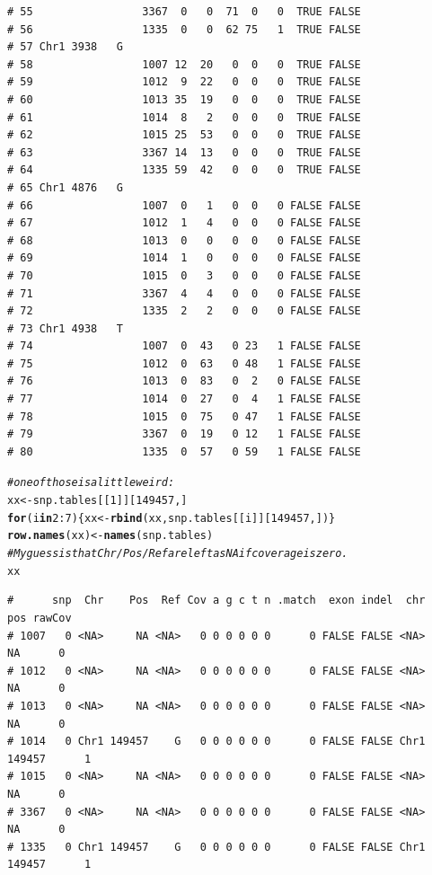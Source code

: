 \documentclass{article}\usepackage[]{graphicx}\usepackage[]{color}
\makeatletter
\newcommand{\hlnum}[1]{\textcolor[rgb]{0.686,0.059,0.569}{#1}}%
\newcommand{\hlcom}[1]{\textcolor[rgb]{0.678,0.584,0.686}{\textit{#1}}}%
\newcommand{\hlopt}[1]{\textcolor[rgb]{0,0,0}{#1}}%
\newcommand{\hlstd}[1]{\textcolor[rgb]{0.345,0.345,0.345}{#1}}%
\newcommand{\hlkwa}[1]{\textcolor[rgb]{0.161,0.373,0.58}{\textbf{#1}}}%
\newcommand{\hlkwb}[1]{\textcolor[rgb]{0.69,0.353,0.396}{#1}}%
\newcommand{\hlkwd}[1]{\textcolor[rgb]{0.737,0.353,0.396}{\textbf{#1}}}%
\newenvironment{kframe}{%
 \def\at@end@of@kframe{}%
 \ifinner\ifhmode%
  \def\at@end@of@kframe{\end{minipage}}%
  \begin{minipage}{\columnwidth}%
 \fi\fi%
 \def\FrameCommand##1{\hskip\@totalleftmargin \hskip-\fboxsep
 \colorbox{shadecolor}{##1}\hskip-\fboxsep
     \hskip-\linewidth \hskip-\@totalleftmargin \hskip\columnwidth}%
 \MakeFramed {\advance\hsize-\width
   \@totalleftmargin\z@ \linewidth\hsize
   \@setminipage}}%
 {\par\unskip\endMakeFramed%
 \at@end@of@kframe}
\newenvironment{knitrout}{}{} %
\makeatother
\begin{document}
\begin{knitrout}
\begin{kframe}
\begin{verbatim}
# 55                 3367  0   0  71  0   0  TRUE FALSE        
# 56                 1335  0   0  62 75   1  TRUE FALSE        
# 57 Chr1 3938   G                                             
# 58                 1007 12  20   0  0   0  TRUE FALSE        
# 59                 1012  9  22   0  0   0  TRUE FALSE        
# 60                 1013 35  19   0  0   0  TRUE FALSE        
# 61                 1014  8   2   0  0   0  TRUE FALSE        
# 62                 1015 25  53   0  0   0  TRUE FALSE        
# 63                 3367 14  13   0  0   0  TRUE FALSE        
# 64                 1335 59  42   0  0   0  TRUE FALSE        
# 65 Chr1 4876   G                                             
# 66                 1007  0   1   0  0   0 FALSE FALSE        
# 67                 1012  1   4   0  0   0 FALSE FALSE        
# 68                 1013  0   0   0  0   0 FALSE FALSE        
# 69                 1014  1   0   0  0   0 FALSE FALSE        
# 70                 1015  0   3   0  0   0 FALSE FALSE        
# 71                 3367  4   4   0  0   0 FALSE FALSE        
# 72                 1335  2   2   0  0   0 FALSE FALSE        
# 73 Chr1 4938   T                                             
# 74                 1007  0  43   0 23   1 FALSE FALSE        
# 75                 1012  0  63   0 48   1 FALSE FALSE        
# 76                 1013  0  83   0  2   0 FALSE FALSE        
# 77                 1014  0  27   0  4   1 FALSE FALSE        
# 78                 1015  0  75   0 47   1 FALSE FALSE        
# 79                 3367  0  19   0 12   1 FALSE FALSE        
# 80                 1335  0  57   0 59   1 FALSE FALSE
\end{verbatim}
\begin{alltt}
\hlcom{# one of those is a little weird:}
\hlstd{xx}\hlkwb{<-}\hlstd{snp.tables[[}\hlnum{1}\hlstd{]][}\hlnum{149457}\hlstd{,]}
\hlkwa{for} \hlstd{(i} \hlkwa{in} \hlnum{2}\hlopt{:}\hlnum{7}\hlstd{)\{xx} \hlkwb{<-} \hlkwd{rbind}\hlstd{(xx,snp.tables[[i]][}\hlnum{149457}\hlstd{,])\}}
\hlkwd{row.names}\hlstd{(xx)}\hlkwb{<-}\hlkwd{names}\hlstd{(snp.tables)}
\hlcom{# My guess is that Chr/Pos/Ref are left as NA if coverage is zero.}
\hlstd{xx}
\end{alltt}
\begin{verbatim}
#      snp  Chr    Pos  Ref Cov a g c t n .match  exon indel  chr    pos rawCov
# 1007   0 <NA>     NA <NA>   0 0 0 0 0 0      0 FALSE FALSE <NA>     NA      0
# 1012   0 <NA>     NA <NA>   0 0 0 0 0 0      0 FALSE FALSE <NA>     NA      0
# 1013   0 <NA>     NA <NA>   0 0 0 0 0 0      0 FALSE FALSE <NA>     NA      0
# 1014   0 Chr1 149457    G   0 0 0 0 0 0      0 FALSE FALSE Chr1 149457      1
# 1015   0 <NA>     NA <NA>   0 0 0 0 0 0      0 FALSE FALSE <NA>     NA      0
# 3367   0 <NA>     NA <NA>   0 0 0 0 0 0      0 FALSE FALSE <NA>     NA      0
# 1335   0 Chr1 149457    G   0 0 0 0 0 0      0 FALSE FALSE Chr1 149457      1
\end{verbatim}
\end{kframe}
\end{knitrout}
\end{document}
